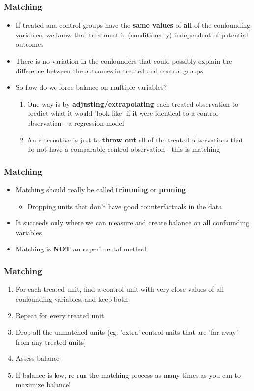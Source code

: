 \documentclass[xcolor=x11names,compress]{beamer}\usepackage[]{graphicx}\usepackage[]{color}
\renewcommand{\(}{\begin{columns}}
\renewcommand{\)}{\end{columns}}
\newcommand{\<}[1]{\begin{column}{#1}}
\renewcommand{\>}{\end{column}}
\begin{document}
\begin{frame}
\frametitle{Matching}
\begin{itemize}
\item If treated and control groups have the \textbf{same values} of \textbf{all} of the confounding variables, we know that treatment is (conditionally) independent of potential outcomes
\pause
\item There is no variation in the confounders that could possibly explain the difference between the outcomes in treated and control groups
\pause
\item So how do we force balance on multiple variables?
\pause
\begin{enumerate}
\item One way is by \textbf{adjusting/extrapolating} each treated observation to predict what it would 'look like' if it were identical to a control observation - a regression model
\pause
\item An alternative is just to \textbf{throw out} all of the treated observations that do not have a comparable control observation - this is matching
\end{enumerate}
\end{itemize}
\end{frame}

\begin{frame}
\frametitle{Matching}
\begin{itemize}
\item Matching should really be called \textbf{trimming} or \textbf{pruning} 
\begin{itemize}
\item Dropping units that don't have good counterfactuals in the data
\end{itemize}
\pause
\item It succeeds only where we can measure and create balance on all confounding variables
\pause
\item Matching is \textbf{NOT} an experimental method
\end{itemize}
\end{frame}

\begin{frame}
\frametitle{Matching}
\begin{enumerate}
\item For each treated unit, find a control unit with very close values of all confounding variables, and keep both
\pause
\item Repeat for every treated unit
\pause
\item Drop all the unmatched units (eg. 'extra' control units that are 'far away' from any treated units)
\pause
\item Assess balance
\pause
\item If balance is low, re-run the matching process as many times as you can to maximize balance!
\end{enumerate}
\end{frame}
\end{document}

